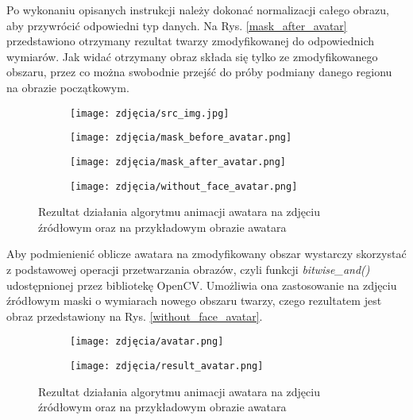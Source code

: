 Po wykonaniu opisanych instrukcji należy dokonać normalizacji całego obrazu, aby przywrócić odpowiedni typ danych. Na Rys. \ref{mask_after_avatar} przedstawiono otrzymany rezultat twarzy zmodyfikowanej do odpowiednich wymiarów. Jak widać otrzymany obraz składa się tylko ze zmodyfikowanego obszaru, przez co można swobodnie przejść do próby podmiany danego regionu na obrazie początkowym.

\begin{figure}[h]
	\centering
	\begin{subfigure}{0.35\textwidth}
		\centering
		\texttt{[image: zdjęcia/src\_img.jpg]}
		\subcaption{\label{src_img}}
	\end{subfigure}
	\begin{subfigure}{0.35\textwidth}
		\centering
		\texttt{[image: zdjęcia/mask\_before\_avatar.png]}
		\subcaption{\label{mask_before_avatar}}
	\end{subfigure}
	\begin{subfigure}{0.35\textwidth}
		\centering
		\texttt{[image: zdjęcia/mask\_after\_avatar.png]}
		\subcaption{\label{mask_after_avatar}}
	\end{subfigure}
	\begin{subfigure}{0.35\textwidth}
		\centering
		\texttt{[image: zdjęcia/without\_face\_avatar.png]}
		\subcaption{\label{without_face_avatar}}
	\end{subfigure}
	
	\caption{\label{fig:result}Rezultat działania algorytmu animacji awatara \protect{} na zdjęciu źródłowym \protect{} oraz na przykładowym obrazie awatara \protect{}}
\end{figure}

Aby podmienienić oblicze awatara na zmodyfikowany obszar wystarczy skorzystać z podstawowej operacji przetwarzania obrazów, czyli funkcji \textit{bitwise\_and()} udostępnionej przez bibliotekę OpenCV. Umożliwia ona zastosowanie na zdjęciu źródłowym maski o wymiarach nowego obszaru twarzy, czego rezultatem jest obraz przedstawiony na Rys. \ref{without_face_avatar}.

\begin{figure}[h]
	\centering
	\begin{subfigure}{0.35\textwidth}
		\centering
		\texttt{[image: zdjęcia/avatar.png]}
		\subcaption{\label{avatar}}
	\end{subfigure}
	\begin{subfigure}{0.35\textwidth}
		\centering
		\texttt{[image: zdjęcia/result\_avatar.png]}
		\subcaption{\label{result_avatar}}
	\end{subfigure}
	
	\caption{\label{fig:result}Rezultat działania algorytmu animacji awatara \protect{} na zdjęciu źródłowym \protect{} oraz na przykładowym obrazie awatara \protect{}}
\end{figure}

